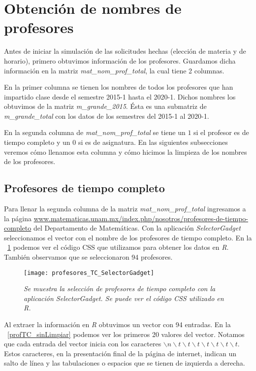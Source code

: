 \section{Obtención de nombres de profesores} \label{nomProfesores}

Antes de iniciar la simulación de las solicitudes hechas (elección de materia y de horario), primero obtuvimos información de los profesores. Guardamos dicha información en la matriz \textit{mat\_nom\_prof\_total}, la cual tiene 2 columnas.

En la primer columna se tienen los nombres de todos los profesores que han impartido clase desde el semestre 2015-1 hasta el 2020-1. Dichos nombres los obtuvimos de la matriz \textit{m\_grande\_2015}. Ésta es una submatriz de \textit{m\_grande\_total} con los datos de los semestres del 2015-1 al 2020-1.

En la segunda columna de \textit{mat\_nom\_prof\_total} se tiene un $1$ si el profesor es de tiempo completo y un $0$ si es de asignatura. En las siguientes subsecciones veremos cómo llenamos esta columna y cómo hicimos la limpieza de los nombres de los profesores.

\subsection{Profesores de tiempo completo}

Para llenar la segunda columna de la matriz \textit{mat\_nom\_prof\_total} ingresamos a la página \url{www.matematicas.unam.mx/index.php/nosotros/profesores-de-tiempo-completo} del Departamento de Matemáticas. Con la aplicación \textit{SelectorGadget} seleccionamos el vector con el nombre de los profesores de tiempo completo. En la \figurename{~\ref{profTC_SelectorGadget}} podemos ver el código CSS que utilizamos para obtener los datos en \textit{R}. También observamos que se seleccionaron 94 profesores.

\begin{figure}[H]
\centering
\texttt{[image: profesores\_TC\_SelectorGadget]} %
\caption[\textit{Profesores de tiempo completo: SelectorGadget}]{\textit{Se muestra la selección de profesores de tiempo completo con la aplicación SelectorGadget. Se puede ver el código CSS utilizado en R.}}\label{profTC_SelectorGadget}
\end{figure}

Al extraer la información en \textit{R} obtuvimos un vector con 94 entradas. En la \figurename{~\ref{profTC_sinLimpiar}} podemos ver los primeros 20 valores del vector. Notamos que cada entrada del vector inicia con los caracteres $\backslash n \backslash t \backslash t \backslash t \backslash t \backslash t \backslash t \backslash t$. Estos caracteres, en la presentación final de la página de internet, indican un salto de línea y las tabulaciones o espacios que se tienen de izquierda a derecha.

